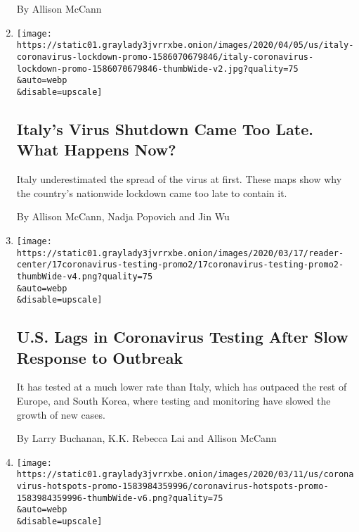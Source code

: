 \begin{enumerate}
  By Allison McCann
\item
  \href{/interactive/2020/04/05/world/europe/italy-coronavirus-lockdown-reopen.html}{}

  \texttt{[image: https://static01.graylady3jvrrxbe.onion/images/2020/04/05/us/italy-coronavirus-lockdown-promo-1586070679846/italy-coronavirus-lockdown-promo-1586070679846-thumbWide-v2.jpg?quality=75\\\&auto=webp\\\&disable=upscale]}

  \hypertarget{italys-virus-shutdown-came-too-late-what-happens-now}{%
  \subsection{Italy's Virus Shutdown Came Too Late. What Happens
  Now?}\label{italys-virus-shutdown-came-too-late-what-happens-now}}

  Italy underestimated the spread of the virus at first. These maps show
  why the country's nationwide lockdown came too late to contain it.

  By Allison McCann, Nadja Popovich and Jin Wu
\item
  \href{/interactive/2020/03/17/us/coronavirus-testing-data.html}{}

  \texttt{[image: https://static01.graylady3jvrrxbe.onion/images/2020/03/17/reader-center/17coronavirus-testing-promo2/17coronavirus-testing-promo2-thumbWide-v4.png?quality=75\\\&auto=webp\\\&disable=upscale]}

  \hypertarget{us-lags-in-coronavirus-testing-after-slow-response-to-outbreak}{%
  \subsection{U.S. Lags in Coronavirus Testing After Slow Response to
  Outbreak}\label{us-lags-in-coronavirus-testing-after-slow-response-to-outbreak}}

  It has tested at a much lower rate than Italy, which has outpaced the
  rest of Europe, and South Korea, where testing and monitoring have
  slowed the growth of new cases.

  By Larry Buchanan, K.K. Rebecca Lai and Allison McCann
\item
  \href{/interactive/2020/world/coronavirus-maps-italy-iran-korea.html}{}

  \texttt{[image: https://static01.graylady3jvrrxbe.onion/images/2020/03/11/us/coronavirus-hotspots-promo-1583984359996/coronavirus-hotspots-promo-1583984359996-thumbWide-v6.png?quality=75\\\&auto=webp\\\&disable=upscale]}


\end{enumerate}
